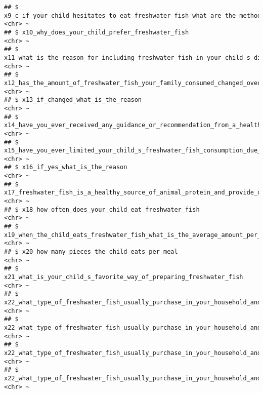 \documentclass[
]{article}
\begin{document}
\begin{verbatim}
## $ x9_c_if_your_child_hesitates_to_eat_freshwater_fish_what_are_the_methods_you_used_to_encourage_improve_their_consumption_usually             <chr> ~
## $ x10_why_does_your_child_prefer_freshwater_fish                                                                                               <chr> ~
## $ x11_what_is_the_reason_for_including_freshwater_fish_in_your_child_s_diet                                                                    <chr> ~
## $ x12_has_the_amount_of_freshwater_fish_your_family_consumed_changed_over_the_last_3_years                                                     <chr> ~
## $ x13_if_changed_what_is_the_reason                                                                                                            <chr> ~
## $ x14_have_you_ever_received_any_guidance_or_recommendation_from_a_healthcare_professional_regarding_freshwater_fish_consumption_of_your_child <chr> ~
## $ x15_have_you_ever_limited_your_child_s_freshwater_fish_consumption_due_to_any_reason                                                         <chr> ~
## $ x16_if_yes_what_is_the_reason                                                                                                                <chr> ~
## $ x17_freshwater_fish_is_a_healthy_source_of_animal_protein_and_provide_other_important_nutrients_for_children                                 <chr> ~
## $ x18_how_often_does_your_child_eat_freshwater_fish                                                                                            <chr> ~
## $ x19_when_the_child_eats_freshwater_fish_what_is_the_average_amount_per_day                                                                   <chr> ~
## $ x20_how_many_pieces_the_child_eats_per_meal                                                                                                  <chr> ~
## $ x21_what_is_your_child_s_favorite_way_of_preparing_freshwater_fish                                                                           <chr> ~
## $ x22_what_type_of_freshwater_fish_usually_purchase_in_your_household_and_how_much_per_month_tilapia                                           <chr> ~
## $ x22_what_type_of_freshwater_fish_usually_purchase_in_your_household_and_how_much_per_month_korali                                            <chr> ~
## $ x22_what_type_of_freshwater_fish_usually_purchase_in_your_household_and_how_much_per_month_hunga                                             <chr> ~
## $ x22_what_type_of_freshwater_fish_usually_purchase_in_your_household_and_how_much_per_month_loolla                                            <chr> ~

\end{verbatim}
\end{document}
